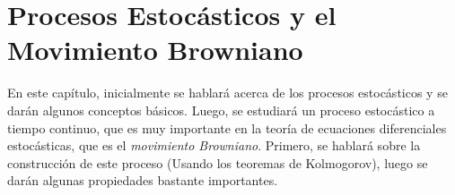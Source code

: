 \chapter{Procesos Estocásticos y el Movimiento Browniano}

En este capítulo, inicialmente se hablará acerca de los procesos estocásticos y se darán algunos conceptos básicos. Luego, se estudiará un proceso estocástico a tiempo continuo, que es muy importante en la teoría de ecuaciones diferenciales estocásticas, que es el \textit{movimiento Browniano}. Primero, se hablará sobre la construcción de este proceso (Usando los teoremas de Kolmogorov), luego se darán algunas propiedades bastante importantes.













